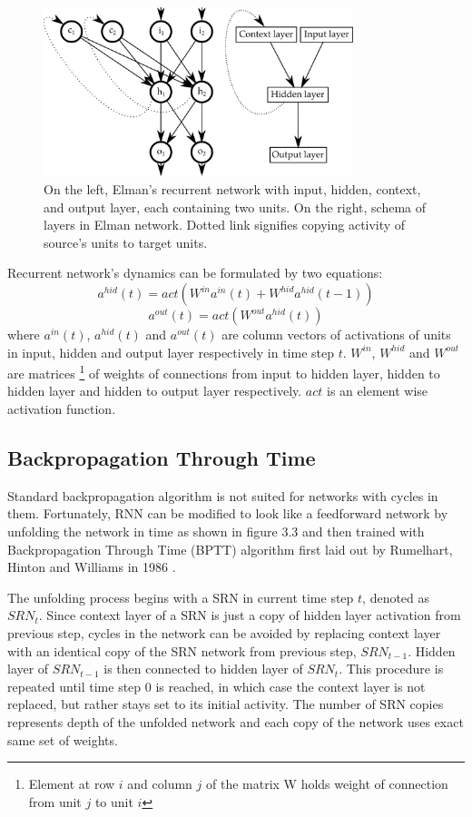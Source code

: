 \documentclass[12pt,oneside]{fithesis2}
\begin{document}
	\begin{figure}[ht]
		\centering
		\includegraphics[width=341px]{elman-rnn.png}
		\caption{On the left, Elman's recurrent network with input, hidden, context, and output layer, each containing two units. On the right, schema of layers in Elman network. Dotted link signifies copying activity of source's units to target units.}
	\end{figure}

Recurrent network's dynamics can be formulated by two equations:
$$a^{hid}(t) = act\left( W^{in}a^{in}(t) + W^{hid} a^{hid}(t-1)\right)$$
$$a^{out}(t) = act\left( W^{out}a^{hid}(t)\right)$$
where $a^{in}(t)$, $a^{hid}(t)$ and $a^{out}(t)$ are column vectors of activations of units in input, hidden and output layer respectively in time step $t$. $W^{in}$, $W^{hid}$ and $W^{out}$ are matrices \footnote{Element at row $i$ and column $j$ of the matrix W holds weight of connection from unit $j$ to unit $i$} of weights of connections from input to hidden layer, hidden to hidden layer and hidden to output layer respectively. $act$ is an element wise activation function.\par

	
\subsection{Backpropagation Through Time}
Standard backpropagation algorithm is not suited for networks with cycles in them. Fortunately, RNN can be modified to look like a feedforward network by unfolding the network in time as shown in figure 3.3 and then trained with Backpropagation Through Time (BPTT) algorithm first laid out by Rumelhart, Hinton and Williams in 1986 \cite{rumelhart-hinton-williams}.\par

The unfolding process begins with a SRN in current time step $t$, denoted as $SRN_t$. Since context layer of a SRN is just a copy of hidden layer activation from previous step, cycles in the network can be avoided by replacing context layer with an identical copy of the SRN network from previous step, $SRN_{t-1}$. Hidden layer of $SRN_{t-1}$ is then connected to hidden layer of $SRN_t$. This procedure is repeated until time step $0$ is reached, in which case the context layer is not replaced, but rather stays set to its initial activity. The number of SRN copies represents depth of the unfolded network and each copy of the network uses exact same set of weights.\par
\end{document}
